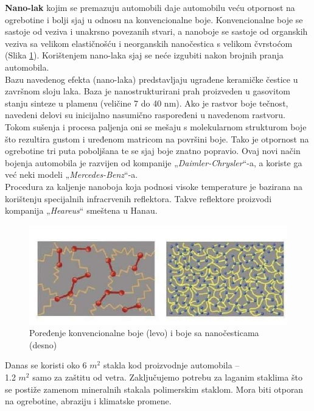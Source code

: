 \documentclass[a4paper]{article}
\begin{document}
{\textbf{Nano-lak} kojim se premazuju automobili daje automobilu veću otpornost na ogrebotine i bolji sjaj u odnosu na konvencionalne boje. Konvencionalne boje se sastoje od veziva i unakrsno povezanih stvari, a nanoboje se sastoje od organskih veziva sa velikom elastičnošću i neorganskih nanočestica s velikom čvrstoćom (Slika \ref{slika_6}). Korištenjem nano-laka sjaj se neće izgubiti nakon brojnih pranja automobila.\\

Bazu navedenog efekta (nano-laka) predstavljaju ugrađene keramičke čestice u završnom sloju laka. Baza je nanostrukturirani prah proizveden u gasovitom stanju sinteze u plamenu (veličine 7 do 40 nm). 
Ako je rastvor boje tečnost, navedeni delovi su inicijalno nasumično raspoređeni u navedenom rastvoru. Tokom sušenja i procesa paljenja oni se mešaju s molekularnom strukturom boje što rezultira gustom i uređenom matricom na površini boje. Tako je otpornost na ogrebotine tri puta poboljšana te se sjaj boje znatno popravio. Ovaj novi način bojenja automobila je razvijen od kompanije „\textit{Daimler-Chrysler}“-a, a koriste ga već neki modeli „\textit{Mercedes-Benz}“-a. \\

Procedura za kaljenje nanoboja koja podnosi visoke temperature je bazirana na korištenju specijalnih infracrvenih reflektora. Takve reflektore proizvodi kompanija „\textit{Heareus}“ smeštena u Hanau.

\begin{figure}[H]
    \centering
    \includegraphics[width=.7\textwidth]{slika 6.jpg}
    \caption{Poređenje konvencionalne boje (levo) i boje sa nanočesticama (desno)}
    \label{slika_6}
\end{figure}

Danas se koristi oko 6 $m^{2}$ stakla kod proizvodnje automobila – \\1.2 $m^{2}$ samo za zaštitu od vetra. Zaključujemo potrebu za laganim staklima što se postiže zamenom mineralnih stakala polimerskim staklom. Mora biti otporan na ogrebotine, abraziju i klimatske promene. \\

}
\end{document}
